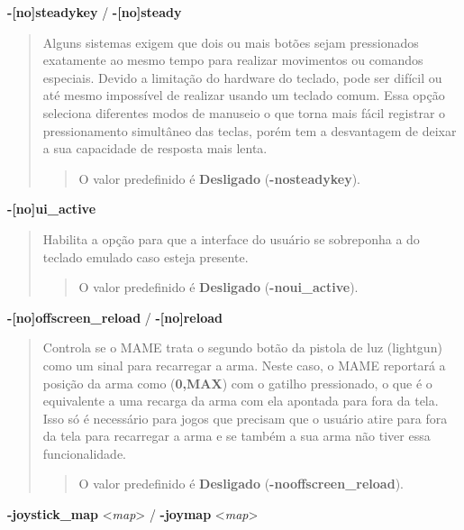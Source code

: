 \documentclass[letterpaper,10pt,brazil]{sphinxmanual}
\begin{document}
\label{commandline/commandline-all:mame-commandline-nosteadykey}
\textbf{-{[}no{]}steadykey} / \textbf{-{[}no{]}steady}
\begin{quote}

Alguns sistemas exigem que dois ou mais botões sejam pressionados
exatamente ao mesmo tempo para realizar movimentos ou comandos
especiais. Devido a limitação do hardware do teclado, pode ser
difícil ou até mesmo impossível de realizar usando um teclado comum.
Essa opção seleciona diferentes modos de manuseio o que torna mais
fácil registrar o pressionamento simultâneo das teclas, porém tem a
desvantagem de deixar a sua capacidade de resposta mais lenta.
\begin{quote}

O valor predefinido é \textbf{Desligado} (\textbf{-nosteadykey}).
\end{quote}
\end{quote}
\label{commandline/commandline-all:mame-commandline-uiactive}
\textbf{-{[}no{]}ui\_active}
\begin{quote}

Habilita a opção para que a interface do usuário se sobreponha a do
teclado emulado caso esteja presente.
\begin{quote}

O valor predefinido é \textbf{Desligado} (\textbf{-noui\_active}).
\end{quote}
\end{quote}
\label{commandline/commandline-all:mame-commandline-nooffscreenreload}
\textbf{-{[}no{]}offscreen\_reload} / \textbf{-{[}no{]}reload}
\begin{quote}

Controla se o MAME trata o segundo botão da pistola de luz
(lightgun) como um sinal para recarregar a arma. Neste caso, o MAME
reportará a posição da arma como (\textbf{0,MAX}) com o gatilho
pressionado, o que é o equivalente a uma recarga da arma com ela
apontada para fora da tela. Isso só é necessário para jogos que
precisam que o usuário atire para fora da tela para recarregar a
arma e se também a sua arma não tiver essa funcionalidade.
\begin{quote}

O valor predefinido é \textbf{Desligado} (\textbf{-nooffscreen\_reload}).
\end{quote}
\end{quote}
\label{commandline/commandline-all:mame-commandline-joystickmap}
\textbf{-joystick\_map} \textless{}\emph{map}\textgreater{} / \textbf{-joymap} \textless{}\emph{map}\textgreater{}
\end{document}

